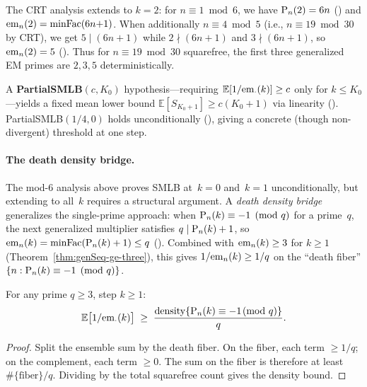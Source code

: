 The CRT analysis extends to $k = 2$: for $n \equiv 1 \bmod 6$, we have
$\mathrm{P}_{n}(2) = 6n$
()
and $\mathrm{em}_{n}(2) = \mathrm{minFac}(6n{+}1)$.  When additionally
$n \equiv 4 \bmod 5$ (i.e., $n \equiv 19 \bmod 30$ by CRT), we get
$5 \mid (6n{+}1)$ while $2 \nmid (6n{+}1)$ and $3 \nmid (6n{+}1)$,
so $\mathrm{em}_{n}(2) = 5$
().
Thus for $n \equiv 19 \bmod 30$ squarefree, the first three
generalized EM primes are $2, 3, 5$ deterministically.

A \textbf{PartialSMLB}$(c, K_0)$ hypothesis---requiring
$\mathbb{E}[1/\mathrm{em}_{\cdot}(k)] \geq c$ only for $k \leq K_0$---yields a
fixed mean lower bound $\mathbb{E}[S_{K_0+1}] \geq c(K_0+1)$ via
linearity
().
PartialSMLB$(1/4, 0)$ holds unconditionally
(),
giving a concrete (though non-divergent) threshold at one step.

\paragraph{The death density bridge.}
\label{sec:death-density}
The mod-6 analysis above proves SMLB at~$k=0$ and~$k=1$
unconditionally, but extending to all~$k$ requires a structural
argument.  A \emph{death density bridge} generalizes the single-prime
approach: when $\mathrm{P}_{n}(k) \equiv -1 \pmod{q}$ for a prime~$q$, the
next generalized multiplier satisfies $q \mid \mathrm{P}_{n}(k)+1$, so
$\mathrm{em}_{n}(k) = \mathrm{minFac}(\mathrm{P}_{n}(k)+1) \leq q$
().
Combined with $\mathrm{em}_{n}(k) \geq 3$ for $k \geq 1$
(Theorem~\ref{thm:genSeq-ge-three}), this gives $1/\mathrm{em}_{n}(k)
\geq 1/q$ on the ``death fiber''
$\{n : \mathrm{P}_{n}(k) \equiv -1 \pmod{q}\}$.

\begin{theorem}
\label{thm:death-density-bridge}
For any prime $q \geq 3$, step $k \geq 1$:
\[
  \mathbb{E}\bigl[1/\mathrm{em}_{\cdot}(k)\bigr]
  \;\geq\;
  \frac{\mathrm{density}\{\mathrm{P}_{n}(k) \equiv -1 \!\!\pmod{q}\}}{q}.
\]
\end{theorem}

\begin{proof}
Split the ensemble sum by the death fiber.  On the fiber,
each term $\geq 1/q$; on the complement, each term $\geq 0$.
The sum on the fiber is therefore at least
$\#\{\text{fiber}\}/q$.  Dividing by the total squarefree
count gives the density bound.
\end{proof}

